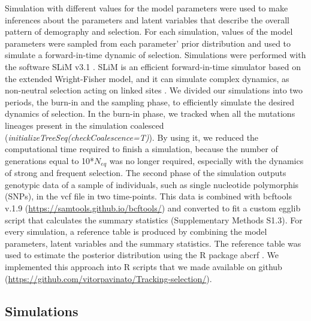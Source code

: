 \documentclass[a4paper, 12pt]{article}
\begin{document}
Simulation with different values for the model parameters were used to make inferences about the parameters and latent variables that describe the overall pattern of demography and selection. For each simulation, values of the model parameters were sampled from each parameter' prior distribution and used to simulate a forward-in-time dynamic of selection. Simulations were performed with the software SLiM v3.1 \citep{Haller:2017gm, Haller:2018gn}. SLiM is an efficient forward-in-time simulator based on the extended Wright-Fisher model, and it can simulate complex dynamics, as non-neutral selection acting on linked sites \citep{Messer:2013ct}. We divided our simulations into two periods, the burn-in and the sampling phase, to efficiently simulate the desired dynamics of selection. In the burn-in phase, we tracked when all the mutations lineages present in the simulation coalesced (\textit{initializeTreeSeq(checkCoalescence=T)}). By using it, we reduced the computational time required to finish a simulation, because the number of generations equal to 10*$N_{eq}$ was no longer required, especially with the dynamics of strong and frequent selection. The second phase of the simulation outputs genotypic data of a sample of individuals, such as single nucleotide polymorphis (SNPs), in the vcf file in two time-points. This data is combined with bcftools v.1.9 (\url{https://samtools.github.io/bcftools/}) and converted to fit a custom egglib script that calculates the summary statistics (Supplementary Methods S1.3). For every simulation, a reference table is produced by combining the model parameters, latent variables and the summary statistics. The reference table was used to estimate the posterior distribution using the R package abcrf \citep{Pudlo:2016il,Raynal:2017wm}. We implemented this approach into R scripts that we made available on github (\url{https://github.com/vitorpavinato/Tracking-selection/}). 

\subsection*{Simulations}
\end{document}
